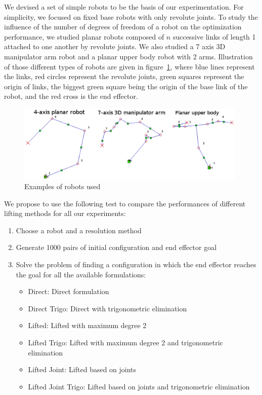 We devised a set of simple robots to be the basis of our experimentation.
For simplicity, we focused on fixed base robots with only revolute joints.
To study the influence of the number of degrees of freedom of a robot on the optimization performance, we studied planar robots composed of $n$ successive links of length 1 attached to one another by revolute joints.
We also studied a 7 axis 3D manipulator arm robot and a planar upper body robot with 2 arms.
Illustration of those different types of robots are given in figure~\ref{fig:robots}, where blue lines represent the links, red circles represent the revolute joints, green squares represent the origin of links, the biggest green square being the origin of the base link of the robot, and the red cross is the end effector.
\begin{figure}
  \centering
  \includegraphics[width=0.98\textwidth]{robots.png}
  \caption{Examples of robots used}
\label{fig:robots}
\end{figure}

We propose to use the following test to compare the performances of different lifting methods for all our experiments:
\begin{enumerate}
  \item Choose a robot and a resolution method
  \item Generate 1000 pairs of initial configuration and end effector goal
  \item Solve the problem of finding a configuration in which the end effector reaches the goal for all the available formulations:
  \begin{itemize}
    \item Direct: Direct formulation
    \item Direct Trigo: Direct with trigonometric elimination
    \item Lifted: Lifted with maximum degree 2
    \item Lifted Trigo: Lifted with maximum degree 2 and trigonometric elimination
    \item Lifted Joint: Lifted based on joints
    \item Lifted Joint Trigo: Lifted based on joints and trigonometric elimination
  \end{itemize}
\end{enumerate}

